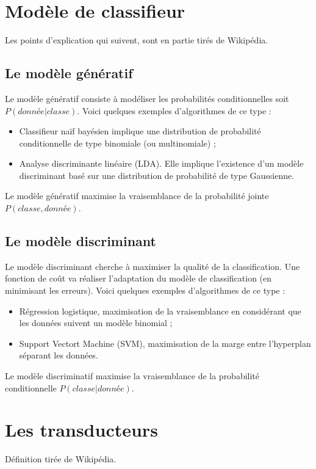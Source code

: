 \section{Modèle de classifieur}
    Les points d'explication qui suivent, sont en partie tirés de Wikipédia\autocite{wiki_discri_gene}.
    \subsection{Le modèle génératif}
    \label{annexe:generatif}
        Le modèle génératif consiste à modéliser les probabilités conditionnelles soit $P(donnée | classe)$. Voici quelques exemples d'algorithmes de ce type :
        \begin{itemize}
            \item Classifieur naïf bayésien implique une distribution de probabilité conditionnelle de type binomiale (ou multinomiale) ;
            \item Analyse discriminante linéaire (LDA). Elle implique l'existence d'un modèle discriminant basé sur une distribution de probabilité de type Gaussienne.
        \end{itemize}
        Le modèle génératif maximise la vraisemblance de la probabilité jointe $P(classe, donnée)$.

    \subsection{Le modèle discriminant}
    \label{annexe:discriminatif}
        Le modèle discriminant cherche à maximiser la qualité de la classification. Une fonction de coût va réaliser l'adaptation du modèle de classification (en minimisant les erreurs). Voici quelques exemples d'algorithmes de ce type :
        \begin{itemize}
            \item Régression logistique, maximisation de la vraisemblance en considérant que les données suivent un modèle binomial ;
            \item Support Vectort Machine (SVM), maximisation de la marge entre l'hyperplan séparant les données.
        \end{itemize}
        Le modèle discriminatif maximise la vraisemblance de la probabilité conditionnelle $P(classe | donnée)$.

\section{Les transducteurs}
\label{annexe:transducteurs}
    Définition tirée de Wikipédia\autocite{wiki_trans}.\\

